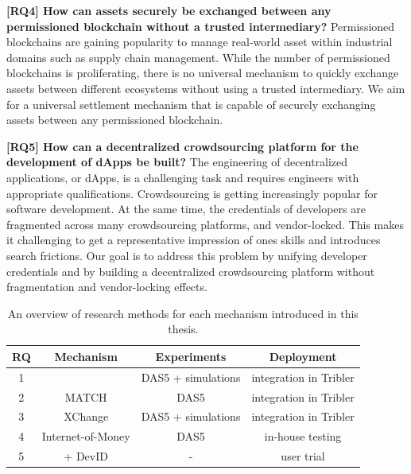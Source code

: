 \textbf{[RQ4] How can assets securely be exchanged between any permissioned blockchain without a trusted intermediary?}
Permissioned blockchains are gaining popularity to manage real-world asset within industrial domains such as supply chain management.
While the number of permissioned blockchains is proliferating, there is no universal mechanism to quickly exchange assets between different ecosystems without using a trusted intermediary.
We aim for a universal settlement mechanism that is capable of securely exchanging assets between any permissioned blockchain.

\textbf{[RQ5] How can a decentralized crowdsourcing platform for the development of dApps be built?}
The engineering of decentralized applications, or dApps, is a challenging task and requires engineers with appropriate qualifications.
Crowdsourcing is getting increasingly popular for software development.
At the same time, the credentials of developers are fragmented across many crowdsourcing platforms, and vendor-locked.
This makes it challenging to get a representative impression of ones skills and introduces search frictions.
Our goal is to address this problem by unifying developer credentials and by building a decentralized crowdsourcing platform without fragmentation and vendor-locking effects.


\begin{table}[t]
	\small
	\centering
	\begin{tabular}{ |c|c|c|c| }
		\hline
		\textbf{RQ} & \textbf{Mechanism} & \textbf{Experiments} & \textbf{Deployment} \\ \hline
		1 & \TrustChain{} & DAS5 + simulations & integration in Tribler \\ \hline
		2 & MATCH & DAS5 & integration in Tribler \\ \hline
		3 & XChange & DAS5 + simulations & integration in Tribler \\ \hline
		4 & Internet-of-Money & DAS5 & in-house testing \\ \hline
		5 & \Dappcoder{} + DevID & - & user trial \\ \hline
	\end{tabular}
	\caption{An overview of research methods for each mechanism introduced in this thesis.}
	\label{table:research_methodology}
\end{table}

